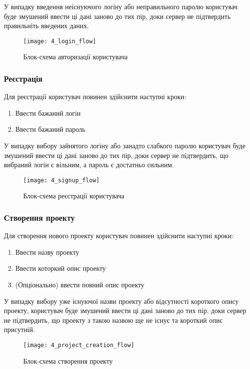 \documentclass[../main.tex]{subfiles}
\begin{document}
У випадку введення неіснуючого логіну або неправильного паролю користувач буде змушений ввести ці дані заново до тих пір, доки сервер не підтвердить правильніть введених даних.

\begin{figure}[H]
	\centering
	\texttt{[image: 4\_login\_flow]}
	\caption{Блок-схема авторизації користувача}
\end{figure}

\subsubsection{Реєстрація}
Для реєстрації користувач повинен здійснити наступні кроки:
\begin{enumerate}
	\item Ввести бажаний логін
	\item Ввести бажаний пароль
\end{enumerate}

У випадку вибору зайнятого логіну або занадто слабкого паролю користувач буде змушений ввести ці дані заново до тих пір, доки сервер не підтвердить, що вибраний логін є вільним, а пароль є достатньо сильним.

\begin{figure}[H]
	\centering
	\texttt{[image: 4\_signup\_flow]}
	\caption{Блок-схема реєстрації користувача}
\end{figure}

\subsubsection{Створення проекту}
Для створення нового проекту користувач повинен здійснити наступні кроки:
\begin{enumerate}
	\item Ввести назву проекту
	\item Ввести которкий опис проекту
	\item (Опціонально) ввести повний опис проекту
\end{enumerate}

У випадку вибору уже існуючої назви проекту або відсутності короткого опису проекту, користувач буде змушений ввести ці дані заново до тих пір, доки сервер не підтвердить, що проекту з такою назвою ще не існує та короткий опис присутній.

\begin{figure}[H]
	\centering
	\texttt{[image: 4\_project\_creation\_flow]}
	\caption{Блок-схема створення проекту}
\end{figure}
\end{document}

